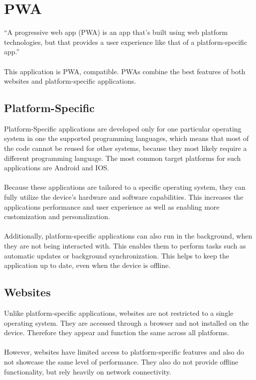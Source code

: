 \documentclass[a4paper,12pt]{report}
\begin{document}
\section{PWA}
“A progressive web app (PWA) is an app that's built using web platform technologies, but that provides a user experience like that of a platform-specific app.” \parencite{mdn-pwa} \\\\
This application is PWA, compatible. PWAs combine the best features of both websites and platform-specific applications. \parencite{mdn-pwa} \\
\subsection{Platform-Specific}
Platform-Specific applications are developed only for one particular operating system in one the supported programming languages, which means that most of the code cannot be reused for other systems, because they most likely require a different programming language. The most common target platforms for such applications are Android and IOS. \\\\
Because these applications are tailored to a specific operating system, they can fully utilize the device’s hardware and software capabilities. This increases the applications performance and user experience as well as enabling more customization and personalization. \parencite{native-apps} \\\\
Additionally, platform-specific applications can also run in the background, when they are not being interacted with. This enables them to perform tasks such as automatic updates or background synchronization. This helps to keep the application up to date, even when the device is offline. \parencite{mdn-pwa} \\
\subsection{Websites}
Unlike platform-specific applications, websites are not restricted to a single operating system. They are accessed through a browser and not installed on the device. Therefore they appear and function the same across all platforms. \parencite{mdn-pwa} \\\\
However, websites have limited access to platform-specific features and also do not showcase the same level of performance. They also do not provide offline functionality, but rely heavily on network connectivity. \\
\end{document}
